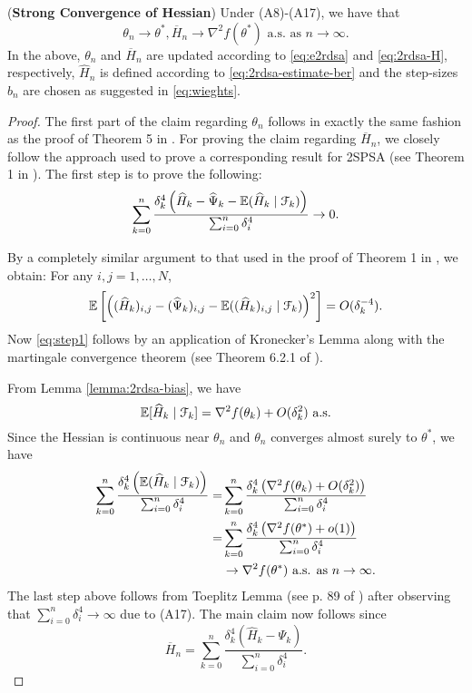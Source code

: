 \begin{theorem}(\textbf{Strong Convergence of Hessian})
\label{thm:2rdsa-H}
Under (A8)-(A17), we have that 
$$\theta_n \rightarrow \theta^*, \overline H_n \rightarrow \nabla^2 f(\theta^*) \text{ a.s. as } n\rightarrow \infty.$$ 
In the above, $\theta_n$ and $\overline H_n$ are updated according to \eqref{eq:e2rdsa} and \eqref{eq:2rdsa-H}, respectively, $\widehat H_n$ is defined according to \eqref{eq:2rdsa-estimate-ber} and the step-sizes $b_n$ are chosen as suggested in \eqref{eq:wieghts}. 
\end{theorem}
\begin{proof}
The first part of the claim regarding $\theta_n$ follows in exactly the same fashion as the proof of Theorem 5 in \cite{prashanth2015rdsa}.  
For proving the claim regarding $\overline H_n$, we closely follow the approach used to prove a corresponding result for 2SPSA (see Theorem 1 in \cite{spall-jacobian}). 
The first step is to prove the following:
\begin{align}
\sum_{k=0}^n \dfrac{\delta_k^4 \left(\widehat H_k - \widehat \Psi_k - \mathbb{E}(\widehat H_k \mid \mathcal{F}_k)\right)}{\sum_{i=0}^n \delta_i^4} \rightarrow 0.
\label{eq:step1}
\end{align}

By a completely similar argument to that used in the proof of Theorem 1 in \cite{spall-jacobian}, we obtain: For any $i,j = 1,\ldots,N$,
\begin{align*}
\mathbb{E} \left[\left((\widehat {H}_k)_{i,j} - (\widehat {\Psi}_k)_{i,j} - \mathbb{E}((\widehat {H}_k)_{i,j} \mid \mathcal{F}_k)\right)^2\right] = O(\delta_k^{-4}).
\end{align*}
Now \eqref{eq:step1} follows by an application of Kronecker's Lemma along with the martingale convergence theorem (see Theorem 6.2.1 of \cite{lahaprobability}).

From Lemma \ref{lemma:2rdsa-bias}, we have 
$$ \mathbb{E}[ \widehat H_k \mid \mathcal{F}_k] = \nabla^2 f(\theta_k) + O(\delta_k^2) \text{ a.s.}$$
Since the Hessian is continuous near $\theta_n$ and $\theta_n$ converges almost surely to $\theta^*$, we have
\begin{align*}
\sum_{k=0}^n \dfrac{\delta_k^4 \left(\mathbb{E}(\widehat H_k \mid \mathcal{F}_k)\right)}{\sum_{i=0}^n \delta_i^4} 
=&\sum_{k=0}^n \dfrac{\delta_k^4 \left(\nabla^2 f(\theta_k) + O(\delta_k^2)\right)}{\sum_{i=0}^n \delta_i^4}\\
=&\sum_{k=0}^n \dfrac{\delta_k^4 \left(\nabla^2 f(\theta^*) + o(1)\right)}{\sum_{i=0}^n \delta_i^4}\\
&\rightarrow \nabla^2 f(\theta^*) \text{ a.s. as } n \rightarrow \infty.
\end{align*}
The last step above follows from Toeplitz Lemma (see p. 89 of \cite{lahaprobability}) after observing that $\sum_{i=0}^n \delta_i^4 \rightarrow \infty$ due to (A17). 
The main claim now follows since 
$$ \overline H_n = \sum_{k=0}^n \dfrac{\delta_k^4 \left(\widehat H_k - \Psi_k \right)}{\sum_{i=0}^n \delta_i^4}.$$
\end{proof}


